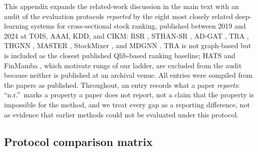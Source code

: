 \documentclass{article}
\begin{document}
This appendix expands the related-work discussion in the main text with an audit of the evaluation protocols \emph{reported} by the eight most closely related deep-learning systems for cross-sectional stock ranking, published between 2019 and 2024 at TOIS, AAAI, KDD, and CIKM: RSR \citep{feng2019temporal}, STHAN-SR \citep{sawhney2021sthansr}, AD-GAT \citep{cheng2021adgat}, TRA \citep{lin2021tra}, THGNN \citep{thgnn2022}, MASTER \citep{li2024master}, StockMixer \citep{fan2024stockmixer}, and MDGNN \citep{qian2024mdgnn}. TRA is not graph-based but is included as the closest published Qlib-based ranking baseline; HATS \citep{kim2019hats} and FinMamba \citep{finmamba2025}, which motivate rungs of our ladder, are excluded from the audit because neither is published at an archival venue. All entries were compiled from the papers as published. Throughout, an entry records what a paper \emph{reports}: ``n.r.''\ marks a property a paper does not report, not a claim that the property is impossible for the method, and we treat every gap as a reporting difference, not as evidence that earlier methods could not be evaluated under this protocol.

\subsection{Protocol comparison matrix}\label{app:lit:matrix}
\end{document}

